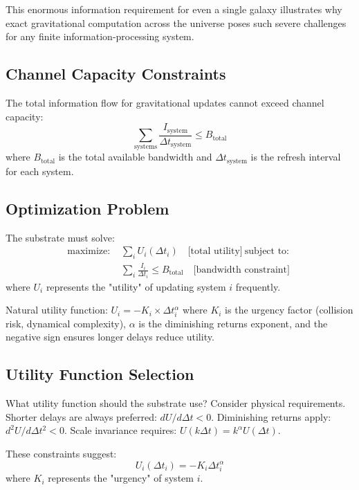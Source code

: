 \documentclass[twocolumn,prd,amsmath,amssymb,aps,superscriptaddress,nofootinbib]{revtex4-2}
\begin{document}
This enormous information requirement for even a single galaxy illustrates why exact gravitational computation across the universe poses such severe challenges for any finite information-processing system.

\subsection{Channel Capacity Constraints}

The total information flow for gravitational updates cannot exceed channel capacity:
\begin{equation}
\sum_{\text{systems}} \frac{I_{\text{system}}}{\Delta t_{\text{system}}} \leq B_{\text{total}}
\end{equation}
where $B_{\text{total}}$ is the total available bandwidth and $\Delta t_{\text{system}}$ is the refresh interval for each system.

\subsection{Optimization Problem}

The substrate must solve:
\begin{align}
\text{maximize: } & \sum_i U_i(\Delta t_i) \quad \text{[total utility]} \
\text{subject to: }\\ & \sum_i \frac{I_i}{\Delta t_i} \leq B_{\text{total}} \quad \text{[bandwidth constraint]}
\end{align}
where $U_i$ represents the "utility" of updating system $i$ frequently.

Natural utility function: $U_i = -K_i \times \Delta t_i^\alpha$ where $K_i$ is the urgency factor (collision risk, dynamical complexity), $\alpha$ is the diminishing returns exponent, and the negative sign ensures longer delays reduce utility.

\subsection{Utility Function Selection}

What utility function should the substrate use? Consider physical requirements. Shorter delays are always preferred: $dU/d\Delta t < 0$. Diminishing returns apply: $d^2U/d\Delta t^2 < 0$. Scale invariance requires: $U(k\Delta t) = k^\alpha U(\Delta t)$.

These constraints suggest:
\begin{equation}
U_i(\Delta t_i) = -K_i \Delta t_i^\alpha
\end{equation}
where $K_i$ represents the "urgency" of system $i$.
\end{document}
